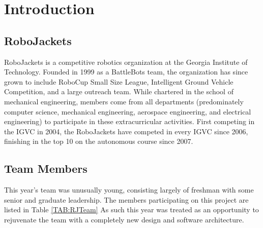 \section{Introduction}

\subsection{RoboJackets}

RoboJackets is a competitive robotics organization at the Georgia Institute of Technology. Founded in 1999 as a BattleBots team, the organization has since grown to include RoboCup Small Size League, Intelligent Ground Vehicle Competition, and a large outreach team. While chartered in the school of mechanical engineering, members come from all departments (predominately computer science, mechanical engineering, aerospace engineering, and electrical engineering) to participate in these extracurricular activities. First competing in the IGVC in 2004, the RoboJackets have competed in every IGVC since 2006, finishing in the top 10 on the autonomous course since 2007.

\subsection{Team Members}

This year's team was unusually young, consisting largely of freshman with some senior and graduate leadership. The members participating on this project are listed in Table \ref{TAB:RJTeam} As such this year was treated as an opportunity to rejuvenate the team with a completely new design and software architecture.

